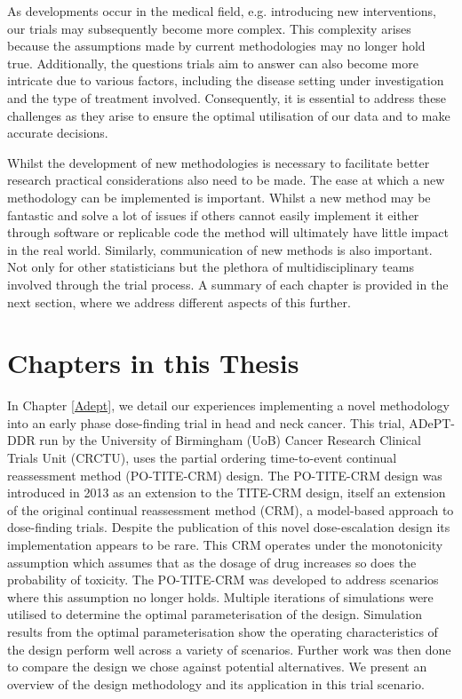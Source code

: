 As developments occur in the medical field, e.g. introducing new interventions, our trials may subsequently become more complex.  This complexity arises because the assumptions made by current methodologies may no longer hold true. Additionally, the questions trials aim to answer can also become more intricate due to various factors, including the disease setting under investigation and the type of treatment involved. Consequently, it is essential to address these challenges as they arise to ensure the optimal utilisation of our data and to make accurate decisions.

Whilst the development of new methodologies is necessary to facilitate better research practical considerations also need to be made. The ease at which a new methodology can be implemented is important. Whilst a new method may be fantastic and solve a lot of issues if others cannot easily implement it either through software or replicable code the method will ultimately have little impact in the real world. Similarly, communication of new methods is also important. Not only for other statisticians but the plethora of multidisciplinary teams involved through the trial process. A summary of each chapter is provided in the next section, where we address different aspects of this further. 
\section{Chapters in this Thesis}

In Chapter \ref{Adept}, we detail our experiences implementing a novel methodology into an early phase dose-finding trial in head and neck cancer. This trial, ADePT-DDR run by the University of Birmingham (UoB) Cancer Research Clinical Trials Unit (CRCTU), uses the partial ordering time-to-event continual reassessment method (PO-TITE-CRM) \cite{wagesUsingTimetoeventContinual2013} design. The PO-TITE-CRM design was introduced in 2013 as an extension to the TITE-CRM design, itself an extension of the original continual reassessment method (CRM), a model-based approach to dose-finding trials. Despite the publication of this novel dose-escalation design its implementation appears to be rare. This CRM operates under the monotonicity assumption which assumes that as the dosage of drug increases so does the probability of toxicity. The PO-TITE-CRM was developed to address scenarios where this assumption no longer holds. Multiple iterations of simulations were utilised to determine the optimal parameterisation of the design. Simulation results from the optimal parameterisation show the operating characteristics of the design perform well across a variety of scenarios. Further work was then done to compare the design we chose against potential alternatives. We present an overview of the design methodology and its application in this trial scenario.

